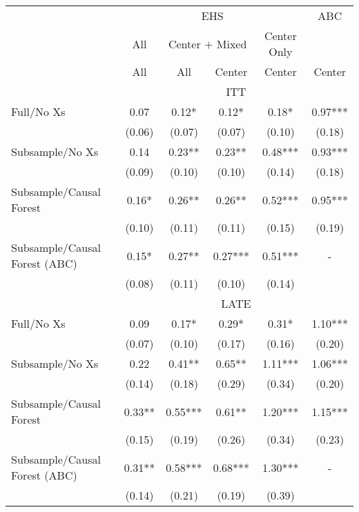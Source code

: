 \begin{tabular}{lccccc}
\toprule 
\midrule 
 & \multicolumn{4}{c}{EHS} & ABC \\
 \cmidrule(lr){2-5} \cmidrule(lr){6-6} 
 & All & \multicolumn{2}{c}{Center $+$ Mixed} & Center Only &  \\
 \cmidrule(lr){2-2} \cmidrule(lr){3-4} \cmidrule(lr){5-5} 
 & All & All & Center & Center & Center \\
\midrule 
 & \multicolumn{5}{c}{ITT} \\
 \cmidrule(lr){2-6} 
Full/No Xs & 0.07 & 0.12* & 0.12* & 0.18* & 0.97*** \\
 & (0.06) & (0.07) & (0.07) & (0.10) & (0.18) \\
Subsample/No Xs & 0.14 & 0.23** & 0.23** & 0.48*** & 0.93*** \\
 & (0.09) & (0.10) & (0.10) & (0.14) & (0.18) \\
Subsample/Causal Forest & 0.16* & 0.26** & 0.26** & 0.52*** & 0.95*** \\
 & (0.10) & (0.11) & (0.11) & (0.15) & (0.19) \\
Subsample/Causal Forest (ABC) & 0.15* & 0.27** & 0.27*** & 0.51*** & - \\
 & (0.08) & (0.11) & (0.10) & (0.14) \\
\midrule 
 & \multicolumn{5}{c}{LATE} \\
 \cmidrule(lr){2-6} 
Full/No Xs & 0.09 & 0.17* & 0.29* & 0.31* & 1.10*** \\
 & (0.07) & (0.10) & (0.17) & (0.16) & (0.20) \\
Subsample/No Xs & 0.22 & 0.41** & 0.65** & 1.11*** & 1.06*** \\
 & (0.14) & (0.18) & (0.29) & (0.34) & (0.20) \\
Subsample/Causal Forest & 0.33** & 0.55*** & 0.61** & 1.20*** & 1.15*** \\
 & (0.15) & (0.19) & (0.26) & (0.34) & (0.23) \\
Subsample/Causal Forest (ABC) & 0.31** & 0.58*** & 0.68*** & 1.30*** & - \\
 & (0.14) & (0.21) & (0.19) & (0.39) \\
\midrule 
\bottomrule 
\end{tabular}
